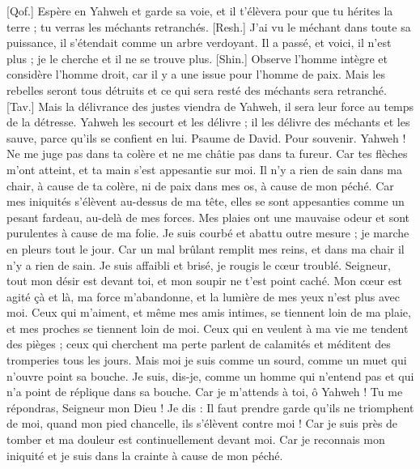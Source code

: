\begin{multicols}{2}
[Qof.] Espère en Yahweh et garde sa voie, et il t'élèvera pour que tu hérites la terre ; tu verras les méchants retranchés.
[Resh.] J'ai vu le méchant dans toute sa puissance, il s'étendait comme un arbre verdoyant.
Il a passé, et voici, il n'est plus ; je le cherche et il ne se trouve plus.
[Shin.] Observe l'homme intègre et considère l'homme droit, car il y a une issue pour l'homme de paix.
Mais les rebelles seront tous détruits et ce qui sera resté des méchants sera retranché.
[Tav.] Mais la délivrance des justes viendra de Yahweh, il sera leur force au temps de la détresse.
Yahweh les secourt et les délivre ; il les délivre des méchants et les sauve, parce qu'ils se confient en lui.
\VerseOne{}Psaume de David. Pour souvenir.
Yahweh ! Ne me juge pas dans ta colère et ne me châtie pas dans ta fureur.
Car tes flèches m'ont atteint, et ta main s'est appesantie sur moi.
Il n'y a rien de sain dans ma chair, à cause de ta colère, ni de paix dans mes os, à cause de mon péché.
Car mes iniquités s'élèvent au-dessus de ma tête, elles se sont appesanties comme un pesant fardeau, au-delà de mes forces.
Mes plaies ont une mauvaise odeur et sont purulentes à cause de ma folie.
Je suis courbé et abattu outre mesure ; je marche en pleurs tout le jour.
Car un mal brûlant remplit mes reins, et dans ma chair il n'y a rien de sain.
Je suis affaibli et brisé, je rougis le cœur troublé.
Seigneur, tout mon désir est devant toi, et mon soupir ne t'est point caché.
Mon cœur est agité çà et là, ma force m'abandonne, et la lumière de mes yeux n'est plus avec moi.
Ceux qui m'aiment, et même mes amis intimes, se tiennent loin de ma plaie, et mes proches se tiennent loin de moi.
Ceux qui en veulent à ma vie me tendent des pièges ; ceux qui cherchent ma perte parlent de calamités et méditent des tromperies tous les jours.
Mais moi je suis comme un sourd, comme un muet qui n'ouvre point sa bouche.
Je suis, dis-je, comme un homme qui n'entend pas et qui n'a point de réplique dans sa bouche.
Car je m'attends à toi, ô Yahweh ! Tu me répondras, Seigneur mon Dieu !
Je dis : Il faut prendre garde qu'ils ne triomphent de moi, quand mon pied chancelle, ils s'élèvent contre moi !
Car je suis près de tomber et ma douleur est continuellement devant moi.
Car je reconnais mon iniquité et je suis dans la crainte à cause de mon péché.

\end{multicols}
